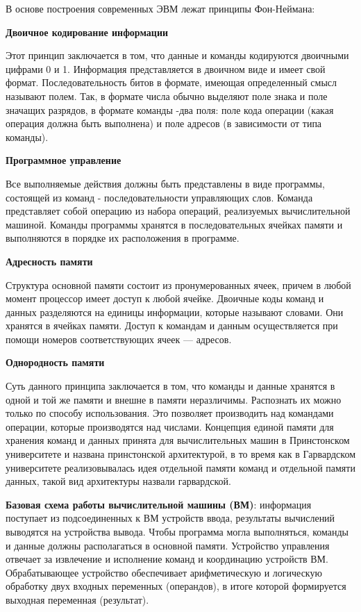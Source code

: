 В основе построения современных ЭВМ лежат принципы Фон-Неймана:

\textbf{Двоичное кодирование информации}

Этот принцип заключается в том, что данные и команды кодируются двоичными
цифрами 0 и 1.  Информация представляется в двоичном виде и имеет свой формат.
Последовательность битов в формате, имеющая определенный смысл называют полем.
Так, в формате числа обычно выделяют поле знака и поле значащих разрядов, в
формате команды -два поля: поле кода операции (какая операция должна быть
выполнена) и поле адресов (в зависимости от типа команды).

\textbf{Программное управление}

Все выполняемые действия должны быть представлены в виде программы, состоящей
из команд - последовательности управляющих слов. Команда представляет собой
операцию из набора операций, реализуемых вычислительной машиной. Команды
программы хранятся в последовательных ячейках памяти и выполняются в порядке их
расположения в программе. 

\textbf{Адресность памяти}

Структура основной памяти состоит из пронумерованных ячеек, причем в любой
момент процессор имеет доступ к любой ячейке. Двоичные коды команд и данных
разделяются на единицы информации, которые называют словами. Они хранятся в
ячейках памяти. Доступ к командам и данным осуществляется при помощи номеров
соответствующих ячеек — адресов.

\textbf{Однородность памяти}

Суть данного принципа заключается в том, что команды и данные хранятся в одной
и той же памяти и внешне в памяти неразличимы. Распознать их можно только по
способу использования. Это позволяет производить над командами операции,
которые производятся над числами. Концепция единой памяти для хранения команд и
данных принята для вычислительных машин в Принстонском университете и названа
принстонской архитектурой, в то время как в Гарвардском университете
реализовывалась идея отдельной памяти команд и отдельной памяти данных, такой
вид архитектуры назвали гарвардской.

\textbf{Базовая схема работы вычислительной машины (ВМ)}: информация поступает из
подсоединенных к ВМ устройств ввода, результаты вычислений выводятся на
устройства вывода. Чтобы программа могла выполняться, команды и данные должны
располагаться в основной памяти. Устройство управления отвечает за извлечение и
исполнение команд  и координацию устройств ВМ. Обрабатывающее устройство
обеспечивает арифметическую и логическую обработку двух входных переменных
(операндов), в итоге которой формируется выходная переменная (результат).

